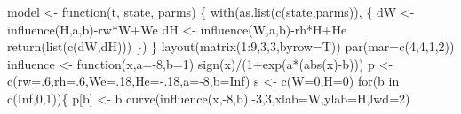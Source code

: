 \documentclass[
  a4paper,
  DIV=11,
  numbers=noendperiod,
  oneside]{scrreprt}
\newenvironment{Shaded}{}{}
\newcommand{\AttributeTok}[1]{\textcolor[rgb]{0.84,0.23,0.29}{#1}}
\newcommand{\ConstantTok}[1]{\textcolor[rgb]{0.00,0.36,0.77}{#1}}
\newcommand{\ControlFlowTok}[1]{\textcolor[rgb]{0.84,0.23,0.29}{#1}}
\newcommand{\DecValTok}[1]{\textcolor[rgb]{0.00,0.36,0.77}{#1}}
\newcommand{\FunctionTok}[1]{\textcolor[rgb]{0.44,0.26,0.76}{#1}}
\newcommand{\NormalTok}[1]{\textcolor[rgb]{0.14,0.16,0.18}{#1}}
\newcommand{\OtherTok}[1]{\textcolor[rgb]{0.44,0.26,0.76}{#1}}
\newcommand{\SpecialCharTok}[1]{\textcolor[rgb]{0.00,0.36,0.77}{#1}}
\newcommand{\StringTok}[1]{\textcolor[rgb]{0.01,0.18,0.38}{#1}}
\begin{document}
\begin{Shaded}
\begin{Highlighting}[]
\NormalTok{model }\OtherTok{\textless{}{-}} \ControlFlowTok{function}\NormalTok{(t, state, parms) \{}
  \FunctionTok{with}\NormalTok{(}\FunctionTok{as.list}\NormalTok{(}\FunctionTok{c}\NormalTok{(state,parms)), \{}
\NormalTok{    dW }\OtherTok{\textless{}{-}} \FunctionTok{influence}\NormalTok{(H,a,b)}\SpecialCharTok{{-}}\NormalTok{rw}\SpecialCharTok{*}\NormalTok{W}\SpecialCharTok{+}\NormalTok{We}
\NormalTok{    dH }\OtherTok{\textless{}{-}} \FunctionTok{influence}\NormalTok{(W,a,b)}\SpecialCharTok{{-}}\NormalTok{rh}\SpecialCharTok{*}\NormalTok{H}\SpecialCharTok{+}\NormalTok{He}
    \FunctionTok{return}\NormalTok{(}\FunctionTok{list}\NormalTok{(}\FunctionTok{c}\NormalTok{(dW,dH)))}
\NormalTok{  \})}
\NormalTok{\}}
\FunctionTok{layout}\NormalTok{(}\FunctionTok{matrix}\NormalTok{(}\DecValTok{1}\SpecialCharTok{:}\DecValTok{9}\NormalTok{,}\DecValTok{3}\NormalTok{,}\DecValTok{3}\NormalTok{,}\AttributeTok{byrow=}\NormalTok{T))}
\FunctionTok{par}\NormalTok{(}\AttributeTok{mar=}\FunctionTok{c}\NormalTok{(}\DecValTok{4}\NormalTok{,}\DecValTok{4}\NormalTok{,}\DecValTok{1}\NormalTok{,}\DecValTok{2}\NormalTok{))}
\NormalTok{influence }\OtherTok{\textless{}{-}} \ControlFlowTok{function}\NormalTok{(x,}\AttributeTok{a=}\SpecialCharTok{{-}}\DecValTok{8}\NormalTok{,}\AttributeTok{b=}\DecValTok{1}\NormalTok{) }\FunctionTok{sign}\NormalTok{(x)}\SpecialCharTok{/}\NormalTok{(}\DecValTok{1}\SpecialCharTok{+}\FunctionTok{exp}\NormalTok{(a}\SpecialCharTok{*}\NormalTok{(}\FunctionTok{abs}\NormalTok{(x)}\SpecialCharTok{{-}}\NormalTok{b)))}
\NormalTok{p }\OtherTok{\textless{}{-}} \FunctionTok{c}\NormalTok{(}\AttributeTok{rw=}\NormalTok{.}\DecValTok{6}\NormalTok{,}\AttributeTok{rh=}\NormalTok{.}\DecValTok{6}\NormalTok{,}\AttributeTok{We=}\NormalTok{.}\DecValTok{18}\NormalTok{,}\AttributeTok{He=}\SpecialCharTok{{-}}\NormalTok{.}\DecValTok{18}\NormalTok{,}\AttributeTok{a=}\SpecialCharTok{{-}}\DecValTok{8}\NormalTok{,}\AttributeTok{b=}\ConstantTok{Inf}\NormalTok{)}
\NormalTok{s }\OtherTok{\textless{}{-}} \FunctionTok{c}\NormalTok{(}\AttributeTok{W=}\DecValTok{0}\NormalTok{,}\AttributeTok{H=}\DecValTok{0}\NormalTok{)}
\ControlFlowTok{for}\NormalTok{(b }\ControlFlowTok{in} \FunctionTok{c}\NormalTok{(}\ConstantTok{Inf}\NormalTok{,}\DecValTok{0}\NormalTok{,}\DecValTok{1}\NormalTok{))\{}
\NormalTok{p[}\StringTok{\textquotesingle{}b\textquotesingle{}}\NormalTok{] }\OtherTok{\textless{}{-}}\NormalTok{ b}
\FunctionTok{curve}\NormalTok{(}\FunctionTok{influence}\NormalTok{(x,}\SpecialCharTok{{-}}\DecValTok{8}\NormalTok{,b),}\SpecialCharTok{{-}}\DecValTok{3}\NormalTok{,}\DecValTok{3}\NormalTok{,}\AttributeTok{xlab=}\StringTok{\textquotesingle{}W\textquotesingle{}}\NormalTok{,}\AttributeTok{ylab=}\StringTok{\textquotesingle{}H\textquotesingle{}}\NormalTok{,}\AttributeTok{lwd=}\DecValTok{2}\NormalTok{)}

\end{Highlighting}
\end{Shaded}
\end{document}
